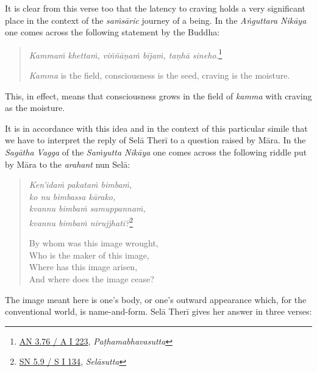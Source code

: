 It is clear from this verse too that the latency to craving holds a very significant place in the context of the \emph{saṁsāric} journey of a being. In the \emph{Aṅguttara Nikāya} one comes across the following statement by the Buddha:

\begin{quote}
\emph{Kammaṁ khettaṁ, viññāṇaṁ bījaṁ, taṇhā sineho}.\footnote{\href{https://suttacentral.net/an3.76/pli/ms}{AN 3.76 / A I 223}, \emph{Paṭhamabhavasutta}}

\emph{Kamma} is the field, consciousness is the seed, craving is the moisture.
\end{quote}

This, in effect, means that consciousness grows in the field of \emph{kamma} with craving as the moisture.

It is in accordance with this idea and in the context of this particular simile that we have to interpret the reply of Selā Therī to a question raised by Māra. In the \emph{Sagātha Vagga} of the \emph{Saṁyutta Nikāya} one comes across the following riddle put by Māra to the \emph{arahant} nun Selā:

\begin{quote}
\emph{Ken'idaṁ pakataṁ bimbaṁ,}\\
\emph{ko nu bimbassa kārako,}\\
\emph{kvannu bimbaṁ samuppannaṁ,}\\
\emph{kvannu bimbaṁ nirujjhati?}\footnote{\href{https://suttacentral.net/sn5.9/pli/ms}{SN 5.9 / S I 134}, \emph{Selāsutta}}

By whom was this image wrought,\\
Who is the maker of this image,\\
Where has this image arisen,\\
And where does the image cease?
\end{quote}

The image meant here is one's body, or one's outward appearance which, for the conventional world, is name-and-form. Selā Therī gives her answer in three verses:

